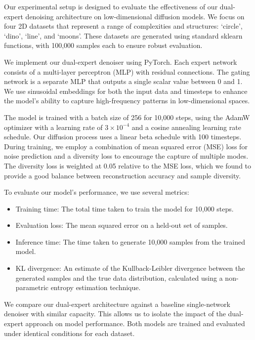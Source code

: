 \documentclass{article} %
\begin{document}
Our experimental setup is designed to evaluate the effectiveness of our dual-expert denoising architecture on low-dimensional diffusion models. We focus on four 2D datasets that represent a range of complexities and structures: `circle', `dino', `line', and `moons'. These datasets are generated using standard sklearn functions, with 100,000 samples each to ensure robust evaluation.

We implement our dual-expert denoiser using PyTorch. Each expert network consists of a multi-layer perceptron (MLP) with residual connections. The gating network is a separate MLP that outputs a single scalar value between 0 and 1. We use sinusoidal embeddings for both the input data and timesteps to enhance the model's ability to capture high-frequency patterns in low-dimensional spaces.

The model is trained with a batch size of 256 for 10,000 steps, using the AdamW optimizer with a learning rate of $3 \times 10^{-4}$ and a cosine annealing learning rate schedule. Our diffusion process uses a linear beta schedule with 100 timesteps. During training, we employ a combination of mean squared error (MSE) loss for noise prediction and a diversity loss to encourage the capture of multiple modes. The diversity loss is weighted at 0.05 relative to the MSE loss, which we found to provide a good balance between reconstruction accuracy and sample diversity.

To evaluate our model's performance, we use several metrics:
\begin{itemize}
    \item Training time: The total time taken to train the model for 10,000 steps.
    \item Evaluation loss: The mean squared error on a held-out set of samples.
    \item Inference time: The time taken to generate 10,000 samples from the trained model.
    \item KL divergence: An estimate of the Kullback-Leibler divergence between the generated samples and the true data distribution, calculated using a non-parametric entropy estimation technique.
\end{itemize}

We compare our dual-expert architecture against a baseline single-network denoiser with similar capacity. This allows us to isolate the impact of the dual-expert approach on model performance. Both models are trained and evaluated under identical conditions for each dataset.
\end{document}
